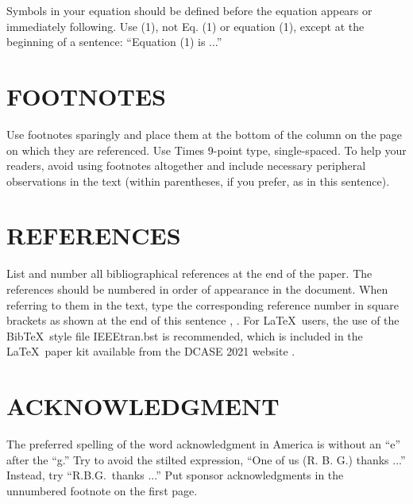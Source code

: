 \documentclass{article}
\begin{document}
\begin{sloppy}
Symbols in your equation should be defined before the equation appears or immediately following.  Use (1), not Eq. (1) or equation (1), except at the beginning of a sentence:  ``Equation (1) is ...''



\section{FOOTNOTES}
\label{sec:foot}

Use footnotes sparingly and place them at the bottom of the column on the page on which they are referenced. Use Times 9-point type, single-spaced. To help your readers, avoid using footnotes altogether and include necessary peripheral observations in the text (within parentheses, if you prefer, as in this sentence).

\section{REFERENCES}
\label{sec:ref}

List and number all bibliographical references at the end of the paper. The references should be numbered in order of appearance in the document. When referring to them in the text, type the corresponding reference number in square brackets as shown at the end of this sentence \cite{cJones2003}, \cite{aSmith2000}. For \LaTeX\ users, the use of the Bib\TeX\ style file IEEEtran.bst is recommended, which is included in the \LaTeX\ paper kit available from the DCASE 2021 website \cite{dcase2021web}.

\section{ACKNOWLEDGMENT}
\label{sec:ack}

The preferred spelling of the word acknowledgment in America is without an ``e'' after the ``g.'' Try to avoid the stilted expression, ``One of us (R. B. G.) thanks ...'' Instead, try ``R.B.G.\ thanks ...''  Put sponsor acknowledgments in the unnumbered footnote on the first page.


\end{sloppy}
\end{document}
